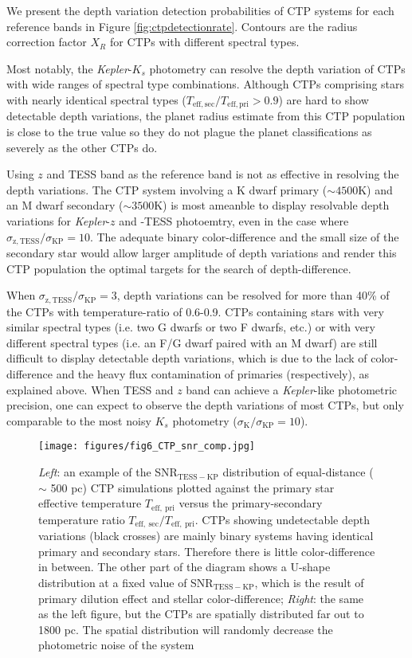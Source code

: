 \documentclass{aastex63}
\begin{document}
    We present the depth variation detection probabilities of CTP systems for each reference bands in Figure \ref{fig:ctpdetectionrate}. Contours are the radius correction factor $X_R$ for CTPs with different spectral types.

    Most notably, the \emph{Kepler}-$K_s$ photometry can resolve the depth variation of CTPs with wide ranges of spectral type combinations. Although CTPs comprising stars with nearly identical spectral types ($T_\mathrm{eff,sec}/T_\mathrm{eff,pri}>0.9$) are hard to show detectable depth variations, the planet radius estimate from this CTP population is close to the true value so they do not plague the planet classifications as severely as the other CTPs do. 

    Using $z$ and TESS band as the reference band is not as effective in resolving the depth variations. The CTP system involving a K dwarf primary ($\sim 4500$K) and an M dwarf secondary ($\sim 3500$K) is most ameanble to display resolvable depth variations for \emph{Kepler}-$z$ and -TESS photoemtry, even in the case where $\sigma_\mathrm{z,TESS}/\sigma_\mathrm{KP}=10$. The adequate binary color-difference and the small size of the secondary star would allow larger amplitude of depth variations and render this CTP population the optimal targets for the search of depth-difference. 

    When $\sigma_\mathrm{z,TESS}/\sigma_\mathrm{KP}=3$, depth variations can be resolved for more than 40\% of the CTPs with temperature-ratio of 0.6-0.9. CTPs containing stars with very similar spectral types (i.e. two G dwarfs or two F dwarfs, etc.) or with very different spectral types (i.e. an F/G dwarf paired with an M dwarf) are still difficult to display detectable depth variations, which is due to the lack of color-difference and the heavy flux contamination of primaries (respectively), as explained above. When TESS and $z$ band can achieve a \emph{Kepler}-like photometric precision, one can expect to observe the depth variations of most CTPs, but only comparable to the most noisy $K_s$ photometry ($\sigma_\mathrm{K}/\sigma_\mathrm{KP}=10$).

    \begin{figure}[ht]
        \centering
        \texttt{[image: figures/fig6\_CTP\_snr\_comp.jpg]}
        \caption{\emph{Left}: an example of the SNR$_\mathrm{TESS-KP}$ distribution of equal-distance ($\sim$ 500 pc) CTP simulations plotted against the primary star effective temperature $T_\mathrm{eff,~pri}$ versus the primary-secondary temperature ratio $T_\mathrm{eff,~sec}/T_\mathrm{eff,~pri}$. CTPs showing undetectable depth variations (black crosses) are mainly binary systems having identical primary and secondary stars. Therefore there is little color-difference in between. The other part of the diagram shows a U-shape distribution at a fixed value of SNR$_\mathrm{TESS-KP}$, which is the result of primary dilution effect and stellar color-difference; \emph{Right}: the same as the left figure, but the CTPs are spatially distributed far out to 1800 pc. The spatial distribution will randomly decrease the photometric noise of the system}
        \label{fig:ctp_snr}
    \end{figure}
    
\end{document}
